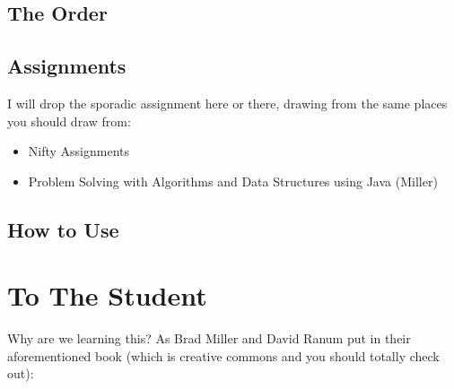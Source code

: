\subsection{The Order}


\subsection{Assignments}
I will drop the sporadic assignment here or there, drawing from the same places you should draw from:
\begin{itemize}
	\item Nifty Assignments
	\item  Problem Solving with Algorithms and Data Structures using Java (Miller)
\end{itemize}

\subsection{How to Use}

\section{To The Student}



Why are we learning this?  As Brad Miller and David Ranum put in their aforementioned book (which is creative commons and you should totally check out):

